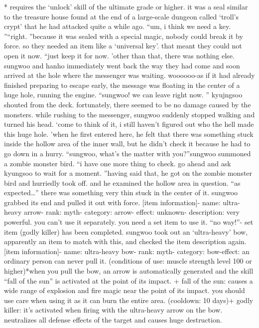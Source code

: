 * requires the ‘unlock’ skill of the ultimate grade or higher.
it was a seal similar to the treasure house found at the end of a large-scale dungeon called ‘troll’s crypt’ that he had attacked quite a while ago.
“um, i think we need a key.
”“right.
”because it was sealed with a special magic, nobody could break it by force.
 so they needed an item like a ‘universal key’.
 that meant they could not open it now.
“just keep it for now.
’other than that, there was nothing else.
 sungwoo and hanho immediately went back the way they had come and soon arrived at the hole where the messenger was waiting.
woooooo-as if it had already finished preparing to escape early, the message was floating in the center of a huge hole, running the engine.
“sungwoo! we can leave right now.
” kyujngsoo shouted from the deck.
fortunately, there seemed to be no damage caused by the monsters.
while rushing to the messenger, sungwoo suddenly stopped walking and turned his head.
‘come to think of it, i still haven’t figured out who the hell made this huge hole.
’when he first entered here, he felt that there was something stuck inside the hollow area of the inner wall, but he didn’t check it because he had to go down in a hurry.
“sungwoo, what’s the matter with you?”sungwoo summoned a zombie monster bird.
“i have one more thing to check.
 go ahead and ask kyungsoo to wait for a moment.
”having said that, he got on the zombie monster bird and hurriedly took off.
 and he examined the hollow area in question.
“as expected…”
there was something very thin stuck in the center of it.
 sungwoo grabbed its end and pulled it out with force.
[item information]- name: ultra-heavy arrow- rank: myth- category: arrow- effect: unknown- description: very powerful.
 you can’t use it separately.
 you need a set item to use it.
“no way!”- set item (godly killer) has been completed.
sungwoo took out an ‘ultra-heavy’ bow, apparently an item to match with this, and checked the item description again.
[item information]- name: ultra-heavy bow- rank: myth- category: bow-effect: an ordinary person can never pull it.
 (conditions of use: muscle strength level 100 or higher)*when you pull the bow, an arrow is automatically generated and the skill “fall of the sun” is activated at the point of its impact.
+ fall of the sun: causes a wide range of explosion and fire magic near the point of its impact.
 you should use care when using it as it can burn the entire area.
 (cooldown: 10 days)+ godly killer: it’s activated when firing with the ultra-heavy arrow on the bow.
 neutralizes all defense effects of the target and causes huge destruction.
